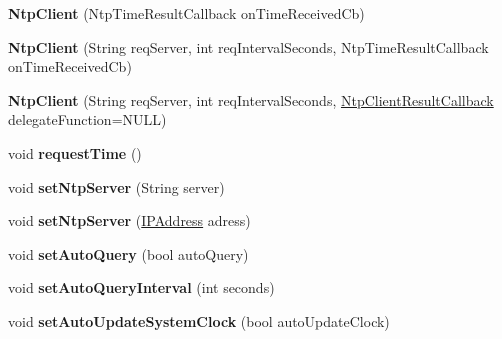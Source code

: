 \begin{DoxyCompactItemize}
\item 
\hypertarget{class_ntp_client_a46add49d6f3467cddd98657adc52022d}{}{\bfseries Ntp\+Client} (Ntp\+Time\+Result\+Callback on\+Time\+Received\+Cb)\label{class_ntp_client_a46add49d6f3467cddd98657adc52022d}

\item 
\hypertarget{class_ntp_client_ac91b12ec68dea642949c09019b42ced4}{}{\bfseries Ntp\+Client} (String req\+Server, int req\+Interval\+Seconds, Ntp\+Time\+Result\+Callback on\+Time\+Received\+Cb)\label{class_ntp_client_ac91b12ec68dea642949c09019b42ced4}

\item 
\hypertarget{class_ntp_client_ae161dd8cad61353e0090dcbf0f152420}{}{\bfseries Ntp\+Client} (String req\+Server, int req\+Interval\+Seconds, \hyperlink{class_delegate}{Ntp\+Client\+Result\+Callback} delegate\+Function=N\+U\+L\+L)\label{class_ntp_client_ae161dd8cad61353e0090dcbf0f152420}

\item 
\hypertarget{class_ntp_client_af02ed50c487b0572e4b00c6159a65b95}{}void {\bfseries request\+Time} ()\label{class_ntp_client_af02ed50c487b0572e4b00c6159a65b95}

\item 
\hypertarget{class_ntp_client_a85a38d86185c7967b4dfb8deed66f3fc}{}void {\bfseries set\+Ntp\+Server} (String server)\label{class_ntp_client_a85a38d86185c7967b4dfb8deed66f3fc}

\item 
\hypertarget{class_ntp_client_a2582e24cb2749e70c220d215da627393}{}void {\bfseries set\+Ntp\+Server} (\hyperlink{class_i_p_address}{I\+P\+Address} adress)\label{class_ntp_client_a2582e24cb2749e70c220d215da627393}

\item 
\hypertarget{class_ntp_client_a5f43fe41391992dd859301c9cf8505b2}{}void {\bfseries set\+Auto\+Query} (bool auto\+Query)\label{class_ntp_client_a5f43fe41391992dd859301c9cf8505b2}

\item 
\hypertarget{class_ntp_client_a801a30e8e1fc876699a8a71ec6cfcc70}{}void {\bfseries set\+Auto\+Query\+Interval} (int seconds)\label{class_ntp_client_a801a30e8e1fc876699a8a71ec6cfcc70}

\item 
\hypertarget{class_ntp_client_ab347aea16a3aba444e7636cfbfefbf0e}{}void {\bfseries set\+Auto\+Update\+System\+Clock} (bool auto\+Update\+Clock)\label{class_ntp_client_ab347aea16a3aba444e7636cfbfefbf0e}

\end{DoxyCompactItemize}
